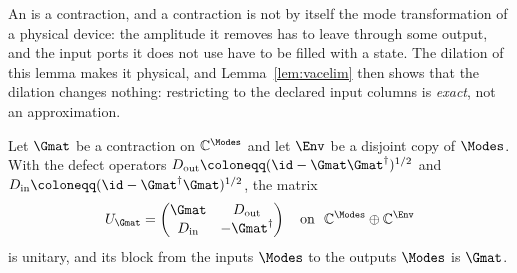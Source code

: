 
An  is a contraction, and a contraction is not by itself
the mode transformation of a physical device: the amplitude it removes has to
leave through some output, and the input ports it does not use have to be
filled with a state. The dilation of this lemma makes it physical, and
Lemma~\ref{lem:vacelim} then shows that the dilation changes nothing:
restricting to the declared input columns is \emph{exact}, not an
approximation.

\begin{lemma}\label{lem:dilation}
Let $\Gmat$ be a contraction on $\mathbb{C}^{\Modes}$ and let
$\Env$ be a disjoint copy of $\Modes$. With the defect operators
$D_{\mathrm{out}}\coloneqq(\id-\Gmat\Gmat^\dagger)^{1/2}$ and
$D_{\mathrm{in}}\coloneqq(\id-\Gmat^\dagger\Gmat)^{1/2}$, the matrix
\begin{equation}\label{eq:dilationmatrix}
  U_{\Gmat}=\begin{pmatrix}\Gmat & D_{\mathrm{out}}\\
                           D_{\mathrm{in}} & -\Gmat^\dagger\end{pmatrix}
  \quad\text{on }\ \mathbb{C}^{\Modes}\oplus\mathbb{C}^{\Env}
\end{equation}
is unitary, and its block from the inputs $\Modes$ to the outputs $\Modes$ is
$\Gmat$.
\end{lemma}

